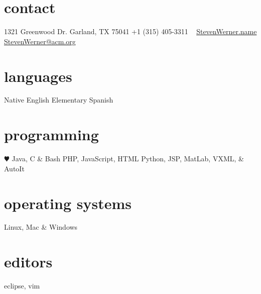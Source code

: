\documentclass[]{friggeri-cv} %
\begin{document}


\begin{aside1} 
\section{contact}
1321 Greenwood Dr.
Garland, TX 75041
+1 (315) 405-3311
~
\href{http://www.StevenWerner.name}{StevenWerner.name}
\href{mailto:StevenWerner@acm.org}{StevenWerner@acm.org}
\section{languages}
Native English
Elementary Spanish
\section{programming}
{\color{red} $\varheartsuit$} Java, C \& Bash
PHP, JavaScript, HTML
Python, JSP, MatLab,
VXML, \& AutoIt %
\section{operating systems}
Linux, Mac \& Windows
\section{editors}
eclipse, vim
\end{aside1}

\end{document}
